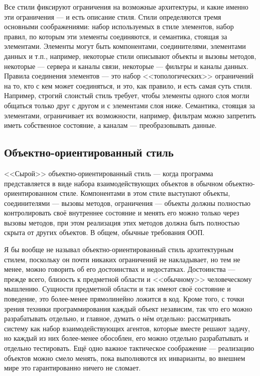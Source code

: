 \documentclass{../../text-style}
\begin{document}
Все стили фиксируют ограничения на возможные архитектуры, и какие именно эти ограничения --- и есть описание стиля. Стили определяются тремя основными соображениями: набор используемых в стиле элементов, набор правил, по которым эти элементы соединяются, и семантика, стоящая за элементами. Элементы могут быть компонентами, соединителями, элементами данных и т.п., например, некоторые стили описывают объекты и вызовы методов, некоторые --- сервера и каналы связи, некоторые --- фильтры и каналы данных. Правила соединения элементов --- это набор <<топологических>> ограничений на то, кто с кем может соединяться, и это, как правило, и есть самая суть стиля. Например, строгий слоистый стиль требует, чтобы элементы одного слоя могли общаться только друг с другом и с элементами слоя ниже. Семантика, стоящая за элементами, ограничивает их возможности, например, фильтрам можно запретить иметь собственное состояние, а каналам --- преобразовывать данные.

\subsection{Объектно-ориентированный стиль}

<<Сырой>> объектно-ориентированный стиль --- когда программа представляется в виде набора взаимодействующих объектов в обычном объектно-ориентированном стиле. Компонентами в этом стиле выступают объекты, соединителями --- вызовы методов, ограничения --- объекты должны полностью контролировать своё внутреннее состояние и менять его можно только через вызовы методов, при этом реализация этих методов должна быть полностью скрыта от других объектов. В общем, обычные требования ООП.

Я бы вообще не называл объектно-ориентированный стиль архитектурным стилем, поскольку он почти никаких ограничений не накладывает, но тем не менее, можно говорить об его достоинствах и недостатках. Достоинства --- прежде всего, близость к предметной области и <<обычному>> человеческому мышлению. Сущности предметной области и так имеют своё состояние и поведение, это более-менее прямолинейно ложится в код. Кроме того, с точки зрения техники программирования каждый объект независим, так что его можно разрабатывать отдельно, и главное, думать о нём отдельно: рассматривать систему как набор взаимодействующих агентов, которые вместе решают задачу, но каждый из них более-менее обособлен, его можно отдельно разрабатывать и отдельно тестировать. Ещё одно важное тактическое соображение --- реализацию объектов можно смело менять, пока выполняются их инварианты, во внешнем мире это гарантированно ничего не сломает.
\end{document}
